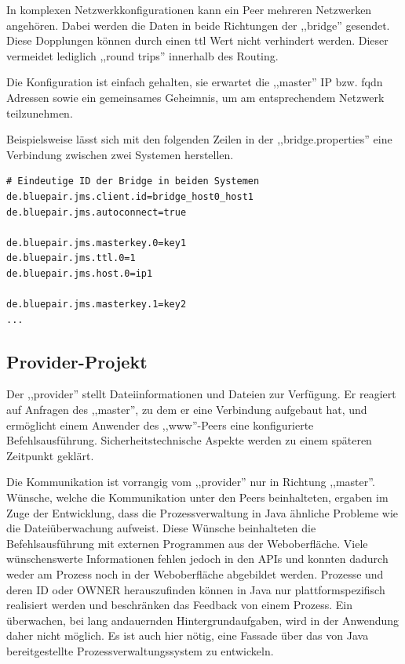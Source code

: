 \documentclass[oneside, ngerman, toc=bibliography,bibliography=totoc,listof=entryprefix, open=right,numbers=noenddot,fontsize=12pt]{scrbook}
\begin{document}
In komplexen Netzwerkkonfigurationen kann ein Peer mehreren Netzwerken angehören.
Dabei werden die Daten in beide Richtungen der ,,bridge'' gesendet. Diese Dopplungen können durch einen \acrfull{ttl} Wert nicht verhindert werden. Dieser vermeidet lediglich ,,round trips'' innerhalb des Routing.

Die Konfiguration ist einfach gehalten, sie erwartet die ,,master'' IP bzw. \acrfull{fqdn} Adressen sowie ein gemeinsames Geheimnis, um am entsprechendem Netzwerk teilzunehmen.

\bigskip
Beispielsweise lässt sich mit den folgenden Zeilen in der ,,bridge.properties'' eine Verbindung zwischen zwei Systemen herstellen.

\begin{verbatim}
# Eindeutige ID der Bridge in beiden Systemen
de.bluepair.jms.client.id=bridge_host0_host1
de.bluepair.jms.autoconnect=true

de.bluepair.jms.masterkey.0=key1
de.bluepair.jms.ttl.0=1
de.bluepair.jms.host.0=ip1

de.bluepair.jms.masterkey.1=key2
...
\end{verbatim}


\subsection{Provider-Projekt}
Der ,,provider'' stellt Dateiinformationen und Dateien zur Verfügung. Er reagiert auf Anfragen des ,,master'', zu dem er eine Verbindung aufgebaut hat, und ermöglicht einem Anwender des ,,www''-Peers eine konfigurierte Befehlsausführung. Sicherheitstechnische Aspekte werden zu einem späteren Zeitpunkt geklärt. 

Die Kommunikation ist vorrangig vom ,,provider'' nur in Richtung ,,master''. 
Wünsche, welche die Kommunikation unter den Peers beinhalteten, ergaben im Zuge der Entwicklung, dass die Prozessverwaltung in Java ähnliche Probleme wie die Dateiüberwachung aufweist. Diese Wünsche beinhalteten die Befehlsausführung mit externen Programmen aus der Weboberfläche. Viele wünschenswerte Informationen fehlen jedoch in den APIs und konnten dadurch weder am Prozess noch in der Weboberfläche abgebildet werden. Prozesse und deren ID oder OWNER herauszufinden können in Java nur plattformspezifisch realisiert werden und beschränken das Feedback von einem Prozess. Ein überwachen, bei lang andauernden Hintergrundaufgaben, wird in der Anwendung daher nicht möglich. Es ist auch hier nötig, eine Fassade über das von Java bereitgestellte Prozessverwaltungssystem zu entwickeln.
\end{document}
